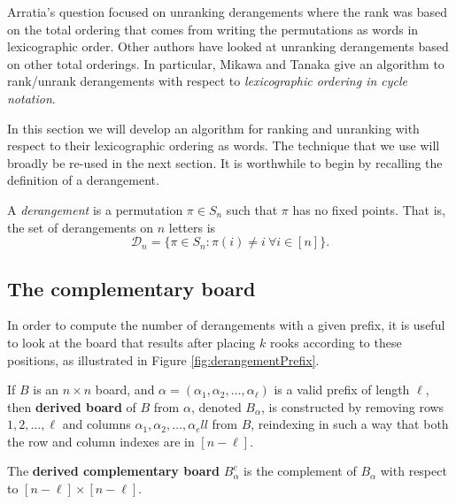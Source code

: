 Arratia's question focused on unranking derangements where the rank was
based on the total ordering that comes from writing the
permutations as words in lexicographic order.
Other authors have looked at unranking derangements based on other total
orderings. In particular, Mikawa and Tanaka \cite{Mikawa2014} give an algorithm
to rank/unrank derangements
with respect to \textit{lexicographic ordering in cycle notation}.

In this section we will develop an algorithm for ranking and unranking with
respect to their lexicographic ordering as words. The technique that we use will
broadly be re-used in the next section.
It is worthwhile to begin by recalling the definition of a derangement.
\begin{definition}
  A \textit{derangement} is a permutation $\pi \in S_n$ such that $\pi$ has no
  fixed points. That is, the set of derangements on $n$ letters is \[
    \mathcal{D}_n = \{\pi \in S_n : \pi(i) \neq i\ \forall i \in [n]\}.
  \]
\end{definition}

\subsection{The complementary board}
In order to compute the number of derangements with a given prefix, it is
useful to look at the board that results after placing $k$ rooks according to
these positions, as illustrated in Figure \ref{fig:derangementPrefix}.



\begin{definition}
  If $B$ is an $n \times n$ board, and
  $\alpha = (\alpha_1, \alpha_2, \dots, \alpha_\ell)$ is a valid prefix of length
  $\ell$, then \textbf{derived board} of $B$ from $\alpha$,
  denoted $B_\alpha$,
  is constructed by removing
  rows $1, 2, \dots, \ell$ and
  columns $\alpha_1, \alpha_2, \dots, \alpha_ell$ from $B$,
  reindexing in such a way that both the row and column indexes are in
  $[n - \ell]$.

  The \textbf{derived complementary board} $B_\alpha^c$ is the complement of
  $B_\alpha$ with respect to $[n - \ell] \times [n - \ell]$.
\end{definition}

